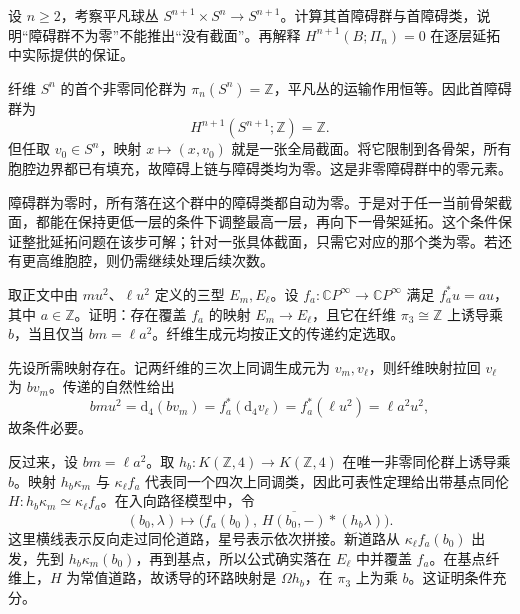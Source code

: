 \begin{exercise}\label{g2:ex:nonzero-obstruction-group-section}
	设 \(n\ge2\)，考察平凡球丛 \(S^{n+1}\times S^n\to S^{n+1}\)。计算其首障碍群与首障碍类，说明“障碍群不为零”不能推出“没有截面”。再解释 \(H^{n+1}(B;\Pi_n)=0\) 在逐层延拓中实际提供的保证。
\end{exercise}
\begin{solution}
	纤维 \(S^n\) 的首个非零同伦群为 \(\pi_n(S^n)=\mathbb Z\)，平凡丛的运输作用恒等。因此首障碍群为
	\[
		H^{n+1}(S^{n+1};\mathbb Z)=\mathbb Z.
	\]
	但任取 \(v_0\in S^n\)，映射 \(x\mapsto(x,v_0)\) 就是一张全局截面。将它限制到各骨架，所有胞腔边界都已有填充，故障碍上链与障碍类均为零。这是非零障碍群中的零元素。

	障碍群为零时，所有落在这个群中的障碍类都自动为零。于是对于任一当前骨架截面，都能在保持更低一层的条件下调整最高一层，再向下一骨架延拓。这个条件保证整批延拓问题在该步可解；针对一张具体截面，只需它对应的那个类为零。若还有更高维胞腔，则仍需继续处理后续次数。
\end{solution}

\begin{exercise}\label{g2:ex:postnikov-two-stage-maps}
	取正文中由 \(m u^2\)、\(\ell u^2\) 定义的三型 \(E_m,E_\ell\)。设 \(f_a:\mathbb CP^\infty\to\mathbb CP^\infty\) 满足 \(f_a^*u=a u\)，其中 \(a\in\mathbb Z\)。证明：存在覆盖 \(f_a\) 的映射 \(E_m\to E_\ell\)，且它在纤维 \(\pi_3\cong\mathbb Z\) 上诱导乘 \(b\)，当且仅当 \(bm=\ell a^2\)。纤维生成元均按正文的传递约定选取。
\end{exercise}
\begin{solution}
	先设所需映射存在。记两纤维的三次上同调生成元为 \(v_m,v_\ell\)，则纤维映射拉回 \(v_\ell\) 为 \(bv_m\)。传递的自然性给出
	\[
		bm u^2=\mathrm d_4(bv_m)=f_a^*(\mathrm d_4v_\ell)=f_a^*(\ell u^2)=\ell a^2u^2,
	\]
	故条件必要。

	反过来，设 \(bm=\ell a^2\)。取 \(h_b:K(\mathbb Z,4)\to K(\mathbb Z,4)\) 在唯一非零同伦群上诱导乘 \(b\)。映射 \(h_b\kappa_m\) 与 \(\kappa_\ell f_a\) 代表同一个四次上同调类，因此可表性定理给出带基点同伦 \(H:h_b\kappa_m\simeq\kappa_\ell f_a\)。在入向路径模型中，令
	\[
		(b_0,\lambda)\longmapsto\bigl(f_a(b_0),\,\overline{H(b_0,-)}*(h_b\lambda)\bigr).
	\]
	这里横线表示反向走过同伦道路，星号表示依次拼接。新道路从 \(\kappa_\ell f_a(b_0)\) 出发，先到 \(h_b\kappa_m(b_0)\)，再到基点，所以公式确实落在 \(E_\ell\) 中并覆盖 \(f_a\)。在基点纤维上，\(H\) 为常值道路，故诱导的环路映射是 \(\Omega h_b\)，在 \(\pi_3\) 上为乘 \(b\)。这证明条件充分。
\end{solution}

